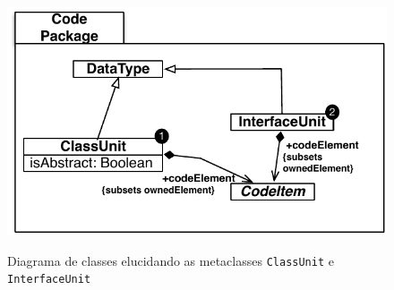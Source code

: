 \begin{figure}[!ht]
	\centering
	\caption{Diagrama de classes elucidando as metaclasses \texttt{ClassUnit} e \texttt{InterfaceUnit}}
	\includegraphics[scale=0.67]{images/ClassUnit_InterfaceUnit}
	\label{fig:classUnit_e_InterfaceUnit}
\end{figure}



